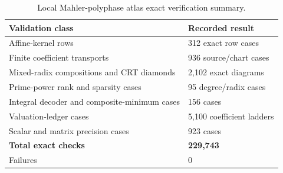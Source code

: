 \begin{table}[htbp]
\centering
\caption{Local Mahler-polyphase atlas exact verification summary.}
\label{tab:block08-validation}
\small
\begin{tabularx}{\textwidth}{@{}L{0.38\textwidth}Y@{}}
\toprule
Validation class & Recorded result\\
\midrule
Affine-kernel rows & 312 exact row cases\\
Finite coefficient transports & 936 source/chart cases\\
Mixed-radix compositions and CRT diamonds & 2,102 exact diagrams\\
Prime-power rank and sparsity cases & 95 degree/radix cases\\
Integral decoder and composite-minimum cases & 156 cases\\
Valuation-ledger cases & 5,100 coefficient ladders\\
Scalar and matrix precision cases & 923 cases\\
\textbf{Total exact checks} & \textbf{229,743}\\
Failures & 0\\
\bottomrule
\end{tabularx}
\end{table}
